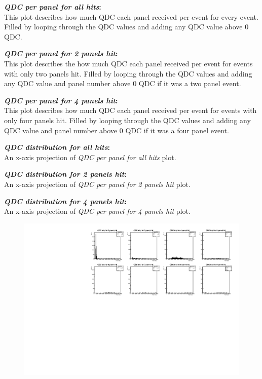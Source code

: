 \documentclass[a4paper,12pt]{article}
\begin{document}
\textbf{\emph{QDC per panel for all hits}:} \\
This plot describes how much QDC each panel received per event for every event. Filled by looping through the QDC values and adding any QDC value above 0 QDC.

\textbf{\emph{QDC per panel for 2 panels hit}:} \\
This plot describes the how much QDC each panel received per event for events with only two panels hit. Filled by looping through the QDC values and adding any QDC value and panel number above 0 QDC if it was a two panel event.

\textbf{\emph{QDC per panel for 4 panels hit}:} \\
This plot describes how much QDC each panel received per event for events with only four panels hit. Filled by looping through the QDC values and adding any QDC value and panel number above 0 QDC if it was a four panel event.

\textbf{\emph{QDC distribution for all hits}:} \\
An x-axis projection of \emph{QDC per panel for all hits} plot.

\textbf{\emph{QDC distribution for 2 panels hit}:} \\
An x-axis projection of \emph{QDC per panel for 2 panels hit} plot.

\textbf{\emph{QDC distribution for 4 panels hit}:} \\
An x-axis projection of \emph{QDC per panel for 4 panels hit} plot.

\pagebreak
\begin{figure}[h]
\centering
\includegraphics[scale=0.8]{QDCtotaln.pdf}
\end{figure}
\end{document}
